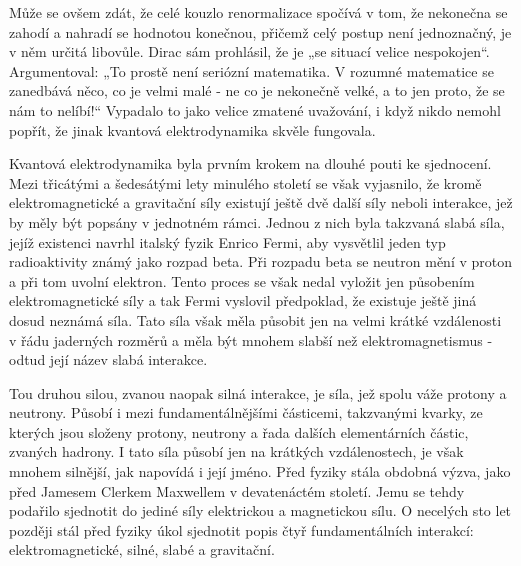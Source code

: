   Může se ovšem zdát, že celé kouzlo renormalizace spočívá v tom, že nekonečna se zahodí a nahradí
  se hodnotou konečnou, přičemž celý postup není jednoznačný, je v něm určitá libovůle. Dirac sám
  prohlásil, že je „se situací velice nespokojen“. Argumentoval: „To prostě není seriózní
  matematika. V rozumné matematice se zanedbává něco, co je velmi malé - ne co je nekonečně velké, a
  to jen proto, že se nám to nelíbí!“ Vypadalo to jako velice zmatené uvažování, i když nikdo nemohl
  popřít, že jinak kvantová elektrodynamika skvěle fungovala. 
  
  Kvantová elektrodynamika byla prvním krokem na dlouhé pouti ke sjednocení. Mezi třicátými a
  šedesátými lety minulého století se však vyjasnilo, že kromě elektromagnetické a gravitační síly
  existují ještě dvě další síly neboli interakce, jež by měly být popsány v jednotném rámci. Jednou
  z nich byla takzvaná slabá síla, jejíž existenci navrhl italský fyzik Enrico Fermi, aby vysvětlil
  jeden typ radioaktivity známý jako rozpad beta. Při rozpadu beta se neutron mění v proton a při
  tom uvolní elektron. Tento proces se však nedal vyložit jen působením elektromagnetické síly a tak
  Fermi vyslovil předpoklad, že existuje ještě jiná dosud neznámá síla. Tato síla však měla působit
  jen na velmi krátké vzdálenosti v řádu jaderných rozměrů a měla být mnohem slabší než
  elektromagnetismus - odtud její název slabá interakce. 
  
  Tou druhou silou, zvanou naopak silná interakce, je síla, jež spolu váže protony a neutrony.
  Působí i mezi fundamentálnějšími částicemi, takzvanými kvarky, ze kterých jsou složeny protony,
  neutrony a řada dalších elementárních částic, zvaných hadrony. I tato síla působí jen na krátkých
  vzdálenostech, je však mnohem silnější, jak napovídá i její jméno. Před fyziky stála obdobná
  výzva, jako před Jamesem Clerkem Maxwellem v devatenáctém století. Jemu se tehdy podařilo
  sjednotit do jediné síly elektrickou a magnetickou sílu. O necelých sto let později stál před
  fyziky úkol sjednotit popis čtyř fundamentálních interakcí: elektromagnetické, silné, slabé a
  gravitační. 
  
